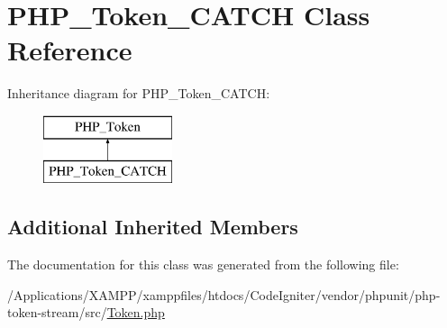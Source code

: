 \hypertarget{class_p_h_p___token___c_a_t_c_h}{}\section{P\+H\+P\+\_\+\+Token\+\_\+\+C\+A\+T\+CH Class Reference}
\label{class_p_h_p___token___c_a_t_c_h}
Inheritance diagram for P\+H\+P\+\_\+\+Token\+\_\+\+C\+A\+T\+CH\+:\begin{figure}[H]
\begin{center}
\leavevmode
\includegraphics[height=2.000000cm]{class_p_h_p___token___c_a_t_c_h}
\end{center}
\end{figure}
\subsection*{Additional Inherited Members}


The documentation for this class was generated from the following file\+:\begin{DoxyCompactItemize}
\item 
/\+Applications/\+X\+A\+M\+P\+P/xamppfiles/htdocs/\+Code\+Igniter/vendor/phpunit/php-\/token-\/stream/src/\mbox{\hyperlink{_token_8php}{Token.\+php}}\end{DoxyCompactItemize}
